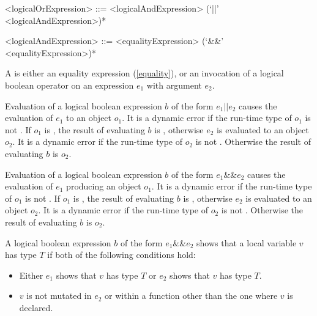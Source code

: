 \documentclass[makeidx]{article}
\begin{document}
{\begin{grammar}
<logicalOrExpression> ::= \gnewline{}
  <logicalAndExpression> (`||' <logicalAndExpression>)*

<logicalAndExpression> ::= <equalityExpression> (`\&\&' <equalityExpression>)*
\end{grammar}

\LMHash{}%
A  is either an equality expression
(\ref{equality}),
or an invocation of a logical boolean operator on
an expression $e_1$ with argument $e_2$.

\LMHash{}%
Evaluation of a logical boolean expression $b$ of the form $e_1 || e_2$ causes
the evaluation of $e_1$ to an object $o_1$.
It is a dynamic error if the run-time type of $o_1$ is not .
If $o_1$ is \TRUE, the result of evaluating $b$ is \TRUE,
otherwise $e_2$ is evaluated to an object $o_2$.
It is a dynamic error if the run-time type of $o_2$ is not .
Otherwise the result of evaluating $b$ is $o_2$.

\LMHash{}%
Evaluation of a logical boolean expression $b$ of the form $e_1 \&\& e_2$
causes the evaluation of $e_1$ producing an object $o_1$.
It is a dynamic error if the run-time type of $o_1$ is not .
If $o_1$ is \FALSE, the result of evaluating $b$ is \FALSE,
otherwise $e_2$ is evaluated to an object $o_2$.
It is a dynamic error if the run-time type of $o_2$ is not .
Otherwise the result of evaluating $b$ is $o_2$.

\LMHash{}%
A logical boolean expression $b$ of the form $e_1 \&\& e_2$
shows that a local variable $v$ has type $T$
if both of the following conditions hold:
\begin{itemize}
\item Either $e_1$ shows that $v$ has type $T$
  or $e_2$ shows that $v$ has type $T$.
\item $v$ is not mutated in $e_2$ or within a function
  other than the one where $v$ is declared.
\end{itemize}

}
\end{document}
